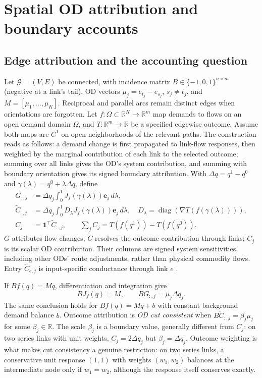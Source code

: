 \documentclass[a4paper,fleqn]{cas-sc}
\newcommand{\R}{\mathbb{R}}
\begin{document}
\section{Spatial OD attribution and boundary accounts}\label{sec:objects}
\subsection{Edge attribution and the accounting question}
Let $\mathcal G=(V,E)$ be connected, with incidence matrix
$B\in\{-1,0,1\}^{n\times m}$ (negative at a link's tail), OD vectors
$\mu_j=e_{t_j}-e_{s_j}$, $s_j\ne t_j$, and $M=[\mu_1,\ldots,\mu_K]$.
Reciprocal and parallel arcs remain distinct edges when orientations are
forgotten. Let $f:\Omega\subset\R^K\to\R^m$ map demands to flows on an
open demand domain $\Omega$, and
$T:\R^m\to\R$ be a specified edgewise outcome. Assume both maps are $C^1$
on open neighborhoods of the relevant paths. The construction reads as
follows: a demand change is first propagated to link-flow responses,
then weighted by the marginal contribution of each link to the selected
outcome; summing over all links gives the OD's system contribution, and
summing with boundary orientation gives its signed boundary attribution.
With $\Delta q=q^1-q^0$ and
$\gamma(\lambda)=q^0+\lambda\Delta q$, define
\begin{align}
G_{:,j}&=\Delta q_j\int_0^1 J_f(\gamma(\lambda))\mathbf e_j\,d\lambda,
\label{eq:Gdef}\\
\widetilde C_{:,j}&=\Delta q_j\int_0^1 D_\lambda J_f(\gamma(\lambda))\mathbf e_j\,d\lambda,
\quad D_\lambda=\operatorname{diag}(\nabla T(f(\gamma(\lambda)))),
\label{eq:Cdef}\\
C_j&=\mathbf1^\top\widetilde C_{:,j},\qquad
\sum_j C_j=T(f(q^1))-T(f(q^0)).\label{eq:Cscalar}
\end{align}
$G$ attributes flow changes; $\widetilde C$ resolves the outcome contribution
through links; $C_j$ is its scalar OD contribution. Their columns are signed
system sensitivities, including other ODs' route adjustments, rather than
physical commodity flows. Entry $\widetilde C_{e,j}$ is input-specific
conductance through link $e$ \citep{dhamdhere2019important}.\label{sec:whyC}

If $Bf(q)=Mq$, differentiation and integration give
\begin{equation}
BJ_f(q)=M,\qquad BG_{:,j}=\mu_j\Delta q_j.\label{eq:anchorchain}
\end{equation}
The same conclusion holds for $Bf(q)=Mq+b$ with constant background demand
balance $b$. Outcome attribution is \emph{OD cut consistent} when
$B\widetilde C_{:,j}=\beta_j\mu_j$ for some $\beta_j\in\R$.
The scale $\beta_j$ is a boundary value, generally different from $C_j$:
on two series links with unit weights, $C_j=2\Delta q_j$ but
$\beta_j=\Delta q_j$. Outcome weighting is what makes cut consistency a
genuine restriction: on two series links, a conservative unit response
$(1,1)$ with weights $(w_1,w_2)$ balances at the intermediate node only
if $w_1=w_2$, although the response itself conserves exactly.
\end{document}
